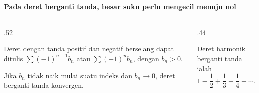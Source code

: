 \documentclass{../../kalkulus-ppt}
\begin{document}
\begin{frame}{\insertsection}
    \framesubtitle{Pada deret berganti tanda, besar suku perlu mengecil menuju nol}
    \begin{columns}[c,onlytextwidth]
        \begin{column}{.52\textwidth}
            \begin{definisi}
                Deret dengan tanda positif dan negatif berselang
                dapat ditulis $\sum (-1)^{n-1}b_n$ atau
                $\sum(-1)^n b_n$, dengan $b_n>0$.
            \end{definisi}
            \begin{teorema}
                Jika $b_n$ tidak naik mulai suatu indeks
                dan $b_n\to0$, deret berganti tanda konvergen.
            \end{teorema}
        \end{column}
        \begin{column}{.44\textwidth}
            \begin{contoh}
                Deret harmonik berganti tanda ialah
                \[
                    1-\frac12+\frac13-\frac14+\cdots.
                \]
            \end{contoh}
        \end{column}
    \end{columns}
\end{frame}
\end{document}

